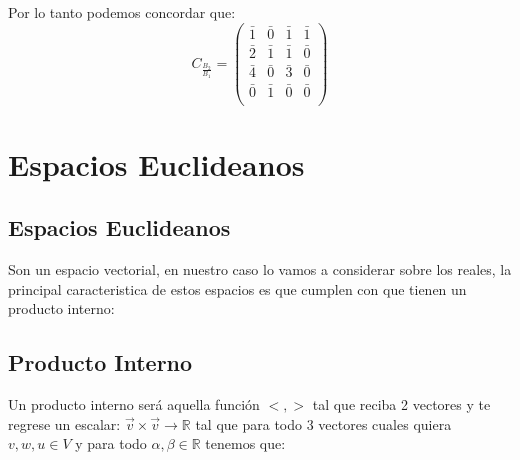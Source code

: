 \documentclass[12pt]{report}                                %
\begin{document}
        Por lo tanto podemos concordar que:
        \begin{equation*}
            C_{\frac{B_2}{B_1}} = 
            \begin{pmatrix}
                \bar{1} & \bar{0} & \bar{1} & \bar{1} \\
                \bar{2} & \bar{1} & \bar{1} & \bar{0} \\
                \bar{4} & \bar{0} & \bar{3} & \bar{0} \\
                \bar{0} & \bar{1} & \bar{0} & \bar{0} \\
            \end{pmatrix}
        \end{equation*}



\chapter{Espacios Euclideanos}
    \clearpage

    \section{Espacios Euclideanos}
        Son un espacio vectorial, en nuestro caso lo vamos a considerar sobre los reales, la principal caracteristica de estos espacios es que cumplen con que tienen un producto interno:


    \clearpage
    \section{Producto Interno}
        Un producto interno será aquella función $<,>$ tal que reciba 2 vectores y
        te regrese un escalar: $\vec v \times \vec v \to \mathbb{R}$ tal que para
        todo 3 vectores cuales quiera $v, w, u \in V$ y para todo
        $\alpha , \beta \in  \mathbb{R} $ tenemos que:
\end{document}
